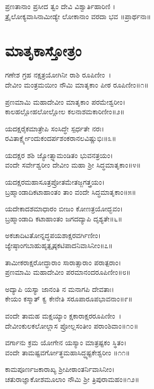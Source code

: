 ಪ್ರಣತಾನಾಂ ಪ್ರಸೀದ ತ್ವಂ ದೇವಿ ವಿಶ್ವಾರ್ತಿಹಾರಿಣಿ ।\\ತ್ರೈಲೋಕ್ಯವಾಸಿನಾಮೀಡ್ಯೇ ಲೋಕಾನಾಂ ವರದಾ ಭವ ॥ಪ್ರಾರ್ಥನಾ॥

\section{ಮಾತೃಕಾಸ್ತೋತ್ರಂ}
ಗಣೇಶ ಗ್ರಹ ನಕ್ಷತ್ರಯೋಗಿನೀ ರಾಶಿ ರೂಪಿಣೀಂ~।\\
ದೇವೀಂ ಮಂತ್ರಮಯೀಂ ನೌಮಿ ಮಾತೃಕಾಂ ಪೀಠ ರೂಪಿಣೀಂ॥೧॥

ಪ್ರಣಮಾಮಿ ಮಹಾದೇವೀಂ ಮಾತೃಕಾಂ ಪರಮೇಶ್ವರೀಂ।\\
ಕಾಲಹಲ್ಲೋಹಲೋಲ್ಲೋಲ ಕಲನಾಶಮಕಾರಿಣೀಂ॥೨॥

ಯದಕ್ಷರೈಕಮಾತ್ರೇಪಿ ಸಂಸಿದ್ಧೇ ಸ್ಪರ್ಧತೇ ನರಃ।\\
ರವಿತಾರ್ಕ್ಷ್ಯೇಂದುಕಂದರ್ಪಶಂಕರಾನಲವಿಷ್ಣುಭಿಃ॥೩॥

ಯದಕ್ಷರ ಶಶಿ ಜ್ಯೋತ್ಸ್ನಾಮಂಡಿತಂ ಭುವನತ್ರಯಂ।\\
ವಂದೇ ಸರ್ವೇಶ್ವರೀಂ ದೇವೀಂ ಮಹಾ ಶ್ರೀ ಸಿದ್ಧಮಾತೃಕಾಂ॥೪॥

ಯದಕ್ಷರಮಹಾಸೂತ್ರಪ್ರೋತಮೇತಜ್ಜಗತ್ತ್ರಯಂ।\\
ಬ್ರಹ್ಮಾಂಡಾದಿಕಟಾಹಾಂತಂ ತಾಂ ವಂದೇ ಸಿದ್ಧಮಾತೃಕಾಂ॥೫॥

ಯದೇಕಾದಶಮಾಧಾರಂ ಬೀಜಂ ಕೋಣತ್ರಯೋದ್ಭವಂ।\\
ಬ್ರಹ್ಮಾಂಡಾದಿ ಕಟಾಹಾಂತಂ ಜಗದದ್ಯಾಪಿ ದೃಶ್ಯತೇ॥೬॥

ಅಕಚಾದಿಟತೋನ್ನದ್ಧಪಯಶಾಕ್ಷರವರ್ಗಿಣೀಂ।\\
ಜ್ಯೇಷ್ಠಾಂಗಬಾಹುಹೃತ್ಪೃಷ್ಠಕಟಿಪಾದನಿವಾಸಿನೀಂ॥೭॥

ತಾಮೀಕರಾಕ್ಷರೋದ್ಧಾರಾಂ ಸಾರಾತ್ಸಾರಾಂ ಪರಾತ್ಪರಾಂ।\\
ಪ್ರಣಮಾಮಿ ಮಹಾದೇವೀಂ ಪರಮಾನಂದರೂಪಿಣೀಂ॥೮॥

ಅದ್ಯಾಪಿ ಯಸ್ಯಾ ಜಾನಂತಿ ನ ಮನಾಗಪಿ ದೇವತಾಃ।\\
ಕೇಯಂ ಕಸ್ಮಾತ್ ಕ್ವ ಕೇನೇತಿ ಸರೂಪಾರೂಪಭಾವನಾಂ॥೯॥

ವಂದೇ ತಾಮಹ ಮಕ್ಷಯ್ಯಾಂ ಕ್ಷಕಾರಾಕ್ಷರರೂಪಿಣೀಂ~।\\
ದೇವೀಂಕುಲಕಲೋಲ್ಲಾಸ ಪ್ರೋಲ್ಲಸಂತೀಂ ಪರಾಂಶಿವಾಂ॥೧೦॥

ವರ್ಗಾನು ಕ್ರಮ ಯೋಗೇನ ಯಸ್ಯಾಂ ಮಾತ್ರಷ್ಟಕಂ ಸ್ಥಿತಂ।\\
ವಂದೇ ತಾಮಷ್ಟವರ್ಗೋತ್ಥಮಹಾಸಿದ್ಧ್ಯಷ್ಟಕೇಶ್ವರೀಂ ॥೧೧॥

ಕಾಮಪೂರ್ಣಜಕಾರಾಖ್ಯ ಶ್ರೀಪೀಠಾಂತರ್ನಿವಾಸಿನೀಂ।\\
ಚತುರಾಜ್ಞಾಕೋಶಮೂಲಾಂ ನೌಮಿ ಶ್ರೀ ತ್ರಿಪುರಾಮಹಂ॥೧೨॥

